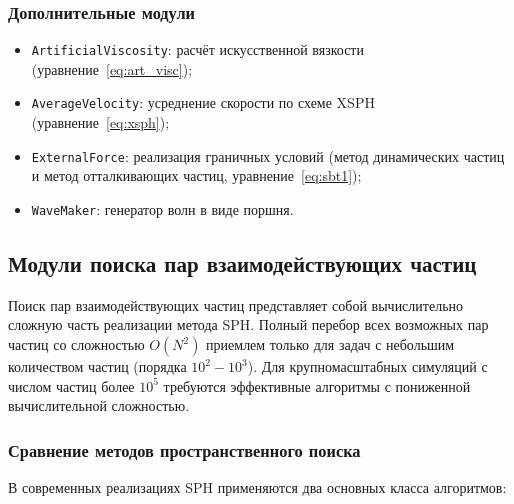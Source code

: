 \subsubsection{Дополнительные модули}
\begin{itemize}
    \item \verb|ArtificialViscosity|: расчёт искусственной вязкости (уравнение~\ref{eq:art_visc});
    \item \verb|AverageVelocity|: усреднение скорости по схеме XSPH (уравнение~\ref{eq:xsph});
    \item \verb|ExternalForce|: реализация граничных условий (метод динамических частиц и метод отталкивающих частиц, уравнение~\ref{eq:sbt1});
    \item \verb|WaveMaker|: генератор волн в виде поршня.
\end{itemize}

\subsection{Модули поиска пар взаимодействующих частиц}

Поиск пар взаимодействующих частиц представляет собой вычислительно сложную часть реализации метода SPH. 
%
Полный перебор всех возможных пар частиц со сложностью $O(N^2)$ 
приемлем только для задач с небольшим количеством частиц (порядка $10^2-10^3$). 
%
Для крупномасштабных симуляций с числом частиц более $10^5$ требуются эффективные алгоритмы с пониженной вычислительной сложностью.

\subsubsection{Сравнение методов пространственного поиска}

В современных реализациях SPH применяются два основных класса алгоритмов:

